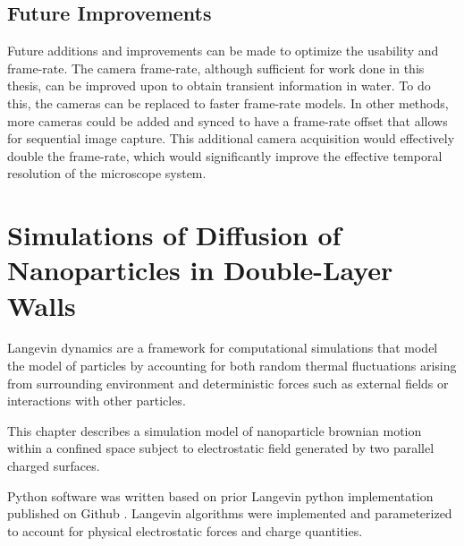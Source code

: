 


\section{Future Improvements}

Future additions and improvements can be made to optimize the usability and frame-rate. The camera frame-rate, although sufficient for work done in this thesis, can be improved upon to obtain transient information in water. To do this, the cameras can be replaced to faster frame-rate models. In other methods, more cameras could be added and synced to have a frame-rate offset that allows for sequential image capture. This additional camera acquisition would effectively double the frame-rate, which would significantly improve the effective temporal resolution of the microscope system. 

\newpage
\chapter{Simulations of Diffusion of Nanoparticles in Double-Layer Walls}
\label{chap:langevinsimulations}

Langevin dynamics are a framework for computational simulations that model the model of particles by accounting for both random thermal fluctuations arising from surrounding environment and deterministic forces such as external fields or interactions with other particles. 

This chapter describes a simulation model of nanoparticle brownian motion within a confined space subject to electrostatic field generated by two parallel charged surfaces.

Python software was written based on prior Langevin python implementation published on Github \cite{millanNumericalSimulationsConfined2023}. Langevin algorithms were implemented and parameterized to account for physical electrostatic forces and charge quantities.   

